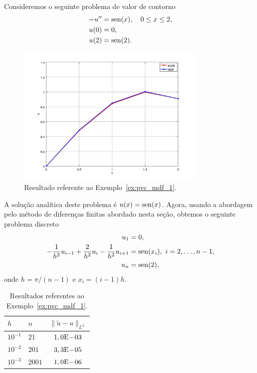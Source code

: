 \begin{ex}\label{ex:pvc_mdf_1}
  Consideremos o seguinte problema de valor de contorno
  \begin{align}
    -u'' &= \operatorname{sen}(x),\quad 0\leq x \leq 2,\\
    u(0) &= 0,\\
    u(2) &= \operatorname{sen}(2).
  \end{align}

\begin{figure}[h!]
  \centering
  \includegraphics[width=0.8\textwidth]{./cap_pvc/dados/ex_pvc_mdf_1/ex_pvc_mdf_1}
  \caption{Resultado referente ao Exemplo~\ref{ex:pvc_mdf_1}.}
  \label{fig:ex_pvc_mdf_1}
\end{figure}

A solução analítica deste problema é $u(x) = \operatorname{sen}(x)$. Agora, usando a abordagem pelo método de diferenças finitas abordado nesta seção, obtemos o seguinte problema discreto
\begin{align}
  u_1 &= 0,\\
  -\frac{1}{h^2}u_{i-1} + \frac{2}{h^2}u_i - \frac{1}{h^2}u_{i+1} &= \operatorname{sen}(x_i),~i=2, \dotsc, n-1,\\
  u_n &= \operatorname{sen}(2),
\end{align}
onde $h=\pi/(n-1)$ e $x_i = (i-1)h$.

\begin{table}[h!]
  \centering
  \begin{tabular}{ll|c}
    $h$ & $n$ & $\|\tilde{u} - u\|_{L^2}$ \\\hline
    $10^{-1}$ & $21$ & $1,0\mathrm{E}\!-\!03$ \\
    $10^{-2}$ & $201$ & $3,3\mathrm{E}\!-\!05$ \\
    $10^{-3}$ & $2001$ & $1,0\mathrm{E}\!-\!06$ \\\hline
  \end{tabular}
  \caption{Resultados referentes ao Exemplo~\ref{ex:pvc_mdf_1}.}
  \label{tab:ex_pvc_mdf_1}
\end{table}


\end{ex}
